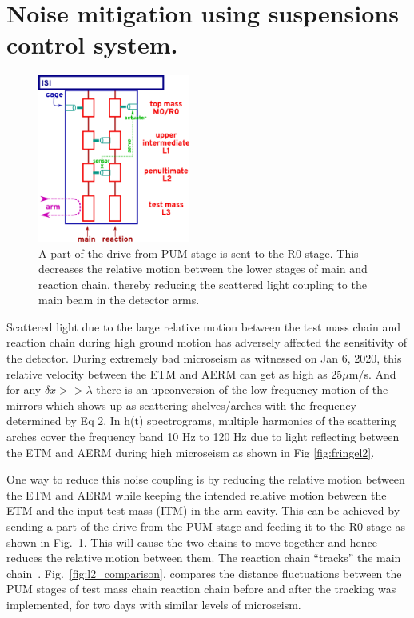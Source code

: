 \documentclass[12pt]{iopart}
\begin{document}
\qquad



\section{Noise mitigation using suspensions control system.} \label{rzero}
\quad
\begin{figure}[h]
    \centering
    \includegraphics[width=5cm]{R0trackingdiagram.png}
    \caption{A part of the drive from PUM stage is sent to the R0 stage. This decreases the relative motion between the lower stages of main and reaction chain, thereby reducing the scattered light coupling to the main beam in the detector arms.}
    \label{fig:r0tracking}
\end{figure} Scattered light due to the large relative motion between the test mass chain and reaction chain during high ground motion has adversely affected the sensitivity of the detector. 
During extremely bad microseism as witnessed on Jan 6, 2020, this relative velocity between the ETM and AERM can get as high as 25${\mu}$m/s. And for any ${\delta}x >> {\lambda}$ there is an upconversion of the low-frequency motion of the mirrors which shows up as scattering shelves/arches with the frequency determined by Eq 2. In h(t) spectrograms, multiple harmonics of the scattering arches cover the frequency band 10 Hz to 120 Hz due to light reflecting between the ETM and AERM during high microseism as shown in Fig \ref{fig:fringel2}.

One way to reduce this noise coupling is by reducing the relative motion between the ETM and AERM while keeping the intended relative motion between the ETM and the input test mass (ITM) in the arm cavity. This can be achieved by sending a part of the drive from the PUM stage and feeding it to the R0 stage as shown in Fig.~\ref{fig:r0tracking}. This will cause the two chains to move together and hence reduces the relative motion between them. The reaction chain ``tracks'' the main chain~\cite{alog_robert}. Fig.~\ref{fig:l2_comparison}. compares the distance fluctuations between the PUM stages of test mass chain reaction chain before and after the tracking was implemented, for two days with similar levels of microseism.
\end{document}
